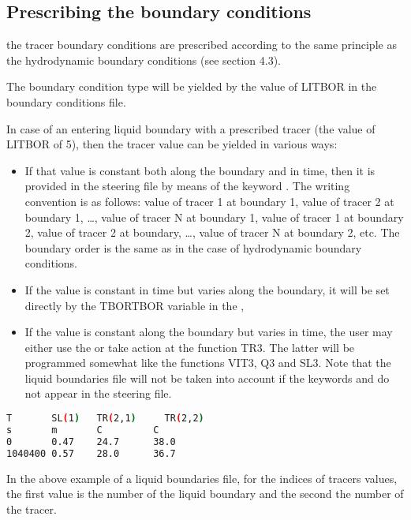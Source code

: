 \subsection{Prescribing the boundary conditions}

the tracer boundary conditions are prescribed according to the same principle
as the hydrodynamic boundary conditions (see section 4.3).

The boundary condition type will be yielded by the value of LITBOR in
the boundary conditions file.

In case of an entering liquid boundary with a prescribed tracer (the value of
LITBOR of 5), then the tracer value can be yielded in various ways:

\begin{itemize}
\item  If that value is constant both along the boundary and in time, then it
is provided in the steering file by means of the keyword . The writing convention is as follows: value of tracer 1 at
boundary 1, value of tracer 2 at boundary 1, \dots , value of tracer N at
boundary 1, value of tracer 1 at boundary 2, value of tracer 2 at boundary,
\dots , value of tracer N at boundary 2, etc. The boundary order is the same as
in the case of hydrodynamic boundary conditions.

\item  If the value is constant in time but varies along the boundary, it will
be set directly by the TBORTBOR variable in the ,

\item  If the value is constant along the boundary but varies in time, the user
may either use the  or take action at the
function TR3. The latter will be programmed somewhat like the functions VIT3,
Q3 and SL3. Note that the liquid boundaries file will not be taken into account
if the keywords  and  do not appear in the steering file.
\end{itemize}

\begin{lstlisting}[language=bash]
T       SL(1)   TR(2,1)     TR(2,2)
s       m       C         C
0       0.47    24.7      38.0
1040400 0.57    28.0      36.7
\end{lstlisting}

In the above example of a liquid boundaries file, for the indices of tracers
values, the first value is the number of the liquid boundary and the second the
number of the tracer.

